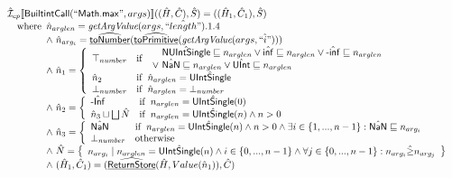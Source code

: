 \[
\begin{array}{ll}

\hat{\mathcal{I}} _{cp}\llbracket \mbox{\textsf{BuiltintCall}}(``\mbox{\textsf{Math.max}}",args)\rrbracket((\hat{H},\hat{C}), \hat{S})
  = ((\hat{H}_1, \hat{C}_1), \hat{S})\\
\quad{\rm where}\begin{array}[t]{l}
  \hat{n}_{arglen} = \emph{getArgValue}(args, \hat{``length"}).1.4\\
  \land\ \hat{n}_{arg_i} = \widehat{\underline{\sf toNumber}}(\widehat{\underline{\sf toPrimitive}}(\emph{getArgValue}(args, \hat{``i"})))\\
  \land\ \hat{n}_1 = \left\{\begin{array}{ll}
      \top_{number} & {\rm if}\begin{array}[t]{l}\begin{array}{l}
          \quad \hat{\mbox{\textsf{NUIntSingle}}} \sqsubseteq n_{arglen} \lor \hat{\mbox{\textsf{inf}}} \sqsubseteq n_{arglen}        
          \lor \hat{\mbox{\textsf{-inf}}} \sqsubseteq n_{arglen}\\
          \lor\ \hat{\mbox{\textsf{NaN}}} \sqsubseteq n_{arglen} \lor \hat{\mbox{\textsf{UInt}}} \sqsubseteq n_{arglen}
        \end{array}\end{array}\\
      \hat{n}_2 & {\rm if}\begin{array}[t]{l}\hat{n}_{arglen} = \hat{\mbox{\textsf{UIntSingle}}}\end{array}\\
      \bot_{number} &  {\rm if}\begin{array}[t]{l}\hat{n}_{arglen} = \bot_{number}\end{array}\\
    \end{array}\right.\\
  \land\ \hat{n}_2 = \left\{\begin{array}{ll}
      \hat{\mbox{\textsf{-Inf}}} & {\rm if}\begin{array}[t]{l}n_{arglen} = \hat{\mbox{\textsf{UIntSingle}}}(0)\end{array}\\
      \hat{n}_3 \sqcup \bigsqcup \hat{N}& {\rm if}\begin{array}[t]{l}n_{arglen} = \hat{\mbox{\textsf{UIntSingle}}}(n) \land n > 0\end{array}\\
    \end{array}\right.\\
  \land\ \hat{n}_3 = \left\{\begin{array}{ll}
      \hat{\mbox{\textsf{NaN}}}
      & {\rm if}\begin{array}[t]{l}n_{arglen} = \hat{\mbox{\textsf{UIntSingle}}}(n)
        \land n > 0 \land \exists i \in \{1,..., n-1\}: \hat{\mbox{\textsf{NaN}}} \sqsubseteq {n}_{arg_i}\end{array}\\
      \bot_{number} & {\rm otherwise}
    \end{array}\right.\\
  \land\ \hat{N} = \left\{\begin{array}{l}{n}_{arg_i} \mid n_{arglen} = \hat{\mbox{\textsf{UIntSingle}}}(n)
    \land i \in \{0,...,n-1\} \land \forall j \in \{0,...,n-1\}: {n}_{arg_i} \hat{\geq} {n}_{arg_j}\end{array}\right\}\\
  \land\ (\hat{H}_1, \hat{C}_1) = (\widehat{\underline{\sf ReturnStore}}(\hat{H}, Value(\hat{n}_1)), \hat{C})
  \end{array}\\
\\\\




\end{array}\]
